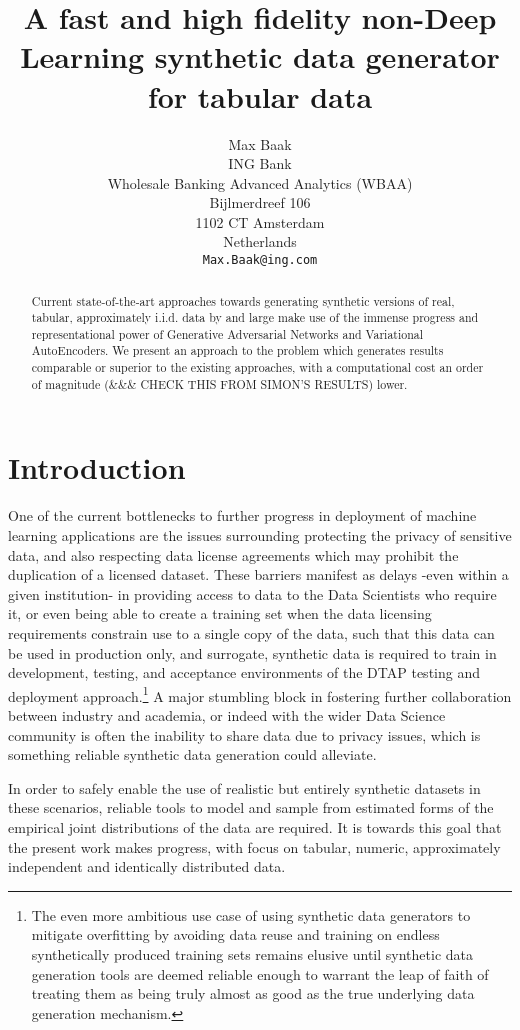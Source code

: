 \documentclass{article}
\title{A fast and high fidelity non-Deep Learning synthetic data generator for tabular data}
\author{%
  Max Baak \\
  ING Bank\\
  Wholesale Banking Advanced Analytics (WBAA)\\
  Bijlmerdreef 106\\
1102 CT Amsterdam\\ 
Netherlands\\
  \texttt{Max.Baak@ing.com} \\
}
\begin{document}
\maketitle

\begin{abstract}
  Current state-of-the-art approaches towards generating synthetic versions of real, tabular, approximately i.i.d. data by and large make use of the immense progress and representational power of Generative Adversarial Networks and Variational AutoEncoders. We present an approach to the problem which generates results comparable or superior to the existing approaches, with a computational cost an order of magnitude (\&\&\& CHECK THIS FROM SIMON'S RESULTS) lower.
\end{abstract}

\section{Introduction}

One of the current bottlenecks to further progress in deployment of machine learning applications are the issues surrounding protecting the privacy of sensitive data, and also respecting data license agreements which may prohibit the duplication of a licensed dataset. These barriers manifest as delays -even within a given institution- in providing access to data to the Data Scientists who require it, or even being able to create a training set when the data licensing requirements constrain use to a single copy of the data, such that this data can be used in production only, and surrogate, synthetic data is required to train in development, testing, and acceptance environments of the DTAP testing and deployment approach.\footnote{The even more ambitious use case of using synthetic data generators to mitigate overfitting by avoiding data reuse and training on endless synthetically produced training sets remains elusive until synthetic data generation tools are deemed reliable enough to warrant the leap of faith of treating them as being truly almost as good as the true underlying data generation mechanism.} A major stumbling block in fostering further collaboration between industry and academia, or indeed with the wider Data Science community is often the inability to share data due to privacy issues, which is something reliable synthetic data generation could alleviate. 

In order to safely enable the use of realistic but entirely synthetic datasets in these scenarios, reliable tools to model and sample from estimated forms of the empirical joint distributions of the data are required. It is towards this goal that the present work makes progress, with focus on tabular, numeric, approximately independent and identically distributed data.
\end{document}
